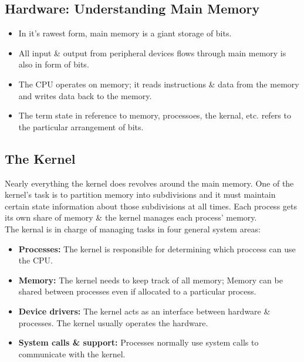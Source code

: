 \documentclass{article}
\begin{document}
	\subsection{Hardware: Understanding Main Memory}
	
	\begin{itemize}

		\item In it's rawest form, main memory is a giant storage of bits.
		\item All input \& output from peripheral devices flows through main memory is also in form of bits.
		\item The CPU operates on memory; it reads instructions \& data from the memory and writes data back to the memory.
		\item The term state in reference to memory, processoes, the kernal, etc. refers to the particular arrangement of bits.

	\end{itemize}

	\subsection{The Kernel}

	Nearly everything the kernel does revolves around the main memory. One of the kernel's task is to partition memory into subdivisions and it must maintain certain state information about those subdivisions at all times. Each process gets its own share of memory \& the kernel manages each process' memory. \\

	The kernal is in charge of managing tasks in four general system areas:
	\begin{itemize}
		\item {\bf Processes:} The kernel is responsible for determining which proccess can use the CPU.
		\item {\bf Memory:} The kernel needs to keep track of all memory; Memory can be shared between processes even if allocated to a particular process.
		\item {\bf Device drivers:} The kernel acts as an interface between hardware \& processes. The kernel usually operates the hardware.
		\item {\bf System calls \& support:} Processes normally use system calls to communicate with the kernel.
	\end{itemize}
	
	
\end{document}
